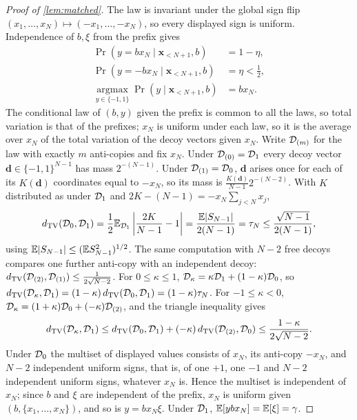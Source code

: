 \begin{proof}[Proof of \cref{lem:matched}]
The law is invariant under the global sign flip $(x_1,\ldots,x_N)\mapsto(-x_1,\ldots,-x_N)$, so every displayed sign is uniform.
Independence of $b,\xi$ from the prefix gives
\begin{align*}
 \Pr(y=b x_N\mid\bm x_{<N+1},b)&=1-\eta,\\
 \Pr(y=-b x_N\mid\bm x_{<N+1},b)&=\eta<\frac{1}{2},\\
 \operatorname*{argmax}_{y\in\{-1,1\}}\Pr(y\mid\bm x_{<N+1},b)&=b x_N.
\end{align*}
The conditional law of $(b,y)$ given the prefix is common to all the laws, so total variation is that of the prefixes;
$x_N$ is uniform under each law, so it is the average over $x_N$ of the total variation of the decoy vectors given $x_N$.
Write $\mathcal D_{(m)}$ for the law with exactly $m$ anti-copies and fix $x_N$.
Under $\mathcal D_{(0)}=\mathcal D_{1}$ every decoy vector $\bm d\in\{-1,1\}^{N-1}$ has mass $2^{-(N-1)}$.
Under $\mathcal D_{(1)}=\mathcal D_{0}$, $\bm d$ arises once for each of its $K(\bm d)$ coordinates equal to $-x_N$, so its mass is
$\tfrac{K(\bm d)}{N-1}2^{-(N-2)}$. With $K$ distributed as under $\mathcal D_{1}$ and $2K-(N-1)=-x_N\sum_{j<N}x_j$,
\[
 d_{\mathrm{TV}}(\mathcal D_{0},\mathcal D_{1})=\frac{1}{2}\mathbb E_{\mathcal D_{1}}\left|\frac{2K}{N-1}-1\right|
 =\frac{\mathbb E|S_{N-1}|}{2(N-1)}=\tau_N\le\frac{\sqrt{N-1}}{2(N-1)},
\]
using $\mathbb E|S_{N-1}|\le(\mathbb E S_{N-1}^2)^{1/2}$.
The same computation with $N-2$ free decoys compares one further anti-copy with an independent decoy:
$d_{\mathrm{TV}}(\mathcal D_{(2)},\mathcal D_{(1)})\le\tfrac{1}{2\sqrt{N-2}}$.
For $0\le\kappa\le1$, $\mathcal D_{\kappa}=\kappa\mathcal D_{1}+(1-\kappa)\mathcal D_{0}$, so
$d_{\mathrm{TV}}(\mathcal D_{\kappa},\mathcal D_{1})=(1-\kappa)\,d_{\mathrm{TV}}(\mathcal D_{0},\mathcal D_{1})=(1-\kappa)\tau_N$.
For $-1\le\kappa<0$, $\mathcal D_{\kappa}=(1+\kappa)\mathcal D_{0}+(-\kappa)\mathcal D_{(2)}$, and the triangle inequality gives
\[
 d_{\mathrm{TV}}(\mathcal D_{\kappa},\mathcal D_{1})\le d_{\mathrm{TV}}(\mathcal D_{0},\mathcal D_{1})+(-\kappa)\,d_{\mathrm{TV}}(\mathcal D_{(2)},\mathcal D_{0})
 \le\frac{1-\kappa}{2\sqrt{N-2}}.
\]
Under $\mathcal D_{0}$ the multiset of displayed values consists of $x_N$, its anti-copy $-x_N$, and $N-2$ independent uniform signs,
that is, of one $+1$, one $-1$ and $N-2$ independent uniform signs, whatever $x_N$ is.
Hence the multiset is independent of $x_N$; since $b$ and $\xi$ are independent of the prefix, $x_N$ is uniform given $(b,\{x_1,\ldots,x_N\})$,
and so is $y=b x_N\xi$. Under $\mathcal D_{1}$, $\mathbb E[y b x_N]=\mathbb E[\xi]=\gamma$.\qedhere
\end{proof}
